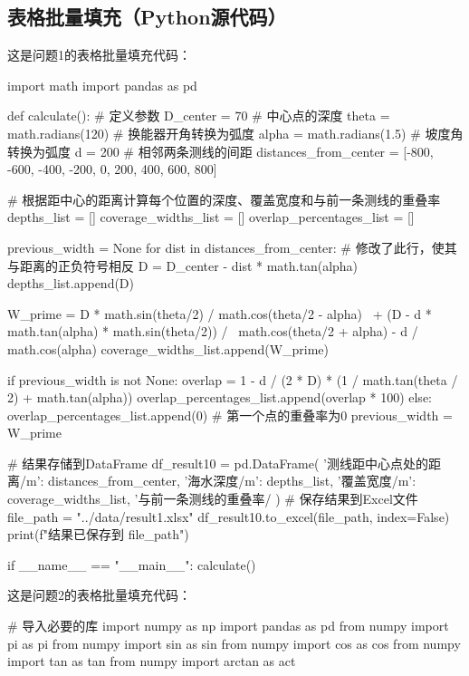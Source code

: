 \documentclass{cumcmthesis}
\begin{document}
\newpage
\begin{appendices}

\section{表格批量填充（Python源代码）}
\noindent 这是问题1的表格批量填充代码：
\begin{tcode}
import math
import pandas as pd

def calculate():
    # 定义参数
    D_center = 70  # 中心点的深度
    theta = math.radians(120)  # 换能器开角转换为弧度
    alpha = math.radians(1.5)  # 坡度角转换为弧度
    d = 200  # 相邻两条测线的间距
    distances_from_center = [-800, -600, -400, -200, 0, 200, 400, 600, 800]

    # 根据距中心的距离计算每个位置的深度、覆盖宽度和与前一条测线的重叠率
    depths_list = []
    coverage_widths_list = []
    overlap_percentages_list = []

    previous_width = None
    for dist in distances_from_center:
        # 修改了此行，使其与距离的正负符号相反
        D = D_center - dist * math.tan(alpha)
        depths_list.append(D)

        W_prime = D * math.sin(theta/2) / math.cos(theta/2 - alpha) \
        					+ (D - d * math.tan(alpha) * math.sin(theta/2)) / \ 
                            math.cos(theta/2 + alpha) - d / math.cos(alpha)
        coverage_widths_list.append(W_prime)

        if previous_width is not None:
            overlap = 1 - d / (2 * D) * (1 / math.tan(theta / 2) + math.tan(alpha))
            overlap_percentages_list.append(overlap * 100)
        else:
            overlap_percentages_list.append(0)  # 第一个点的重叠率为0
        previous_width = W_prime

    # 结果存储到DataFrame
    df_result10 = pd.DataFrame({
        '测线距中心点处的距离/m': distances_from_center,
        '海水深度/m': depths_list,
        '覆盖宽度/m': coverage_widths_list,
        '与前一条测线的重叠率/%
    })
    # 保存结果到Excel文件
    file_path = "../data/result1.xlsx"
    df_result10.to_excel(file_path, index=False)
    print(f"结果已保存到 {file_path}")

if __name__ == "__main__":
    calculate()
\end{tcode}

\noindent 这是问题2的表格批量填充代码：
\begin{tcode}
# 导入必要的库
import numpy as np
import pandas as pd
from numpy import pi as pi
from numpy import sin as sin
from numpy import cos as cos
from numpy import tan as tan
from numpy import arctan as act


\end{tcode}
\end{appendices}
\end{document}
